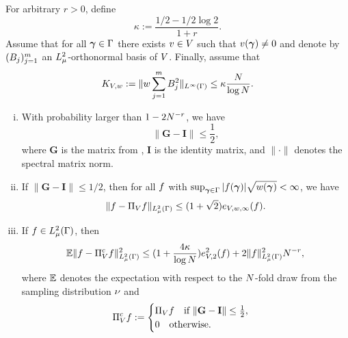 \begin{thm}
	\label{thm:dpls}
For arbitrary $r>0$, define 
$$\kappa:=\frac{1/2-1/2\log 2}{1+r}.$$ Assume that for all $\bm{\gamma}\in\Gamma$ there exists $v\in V$ such that $v(\bm{\gamma})\not =0$ and denote by $(B_j)_{j=1}^{m}$ an $L^2_{\mu}$-orthonormal basis of $V$. Finally, assume that 
\begin{equation}
\label{eq:K}
K_{V,w}:=\|w \sum_{j=1}^{m}B_j^2\|_{L^\infty(\Gamma)}\leq \kappa\frac{N}{\log N}.
\end{equation}
\begin{enumerate}[(i)]
	\item With probability larger than $1-2N^{-r}$, we have
	\begin{equation}
	\|\mathbf{G}-\mathbf{I}\|\leq\frac{1}{2},
	\end{equation}
	where $\mathbf{G}$ is the matrix from , $\mathbf{I}$ is the identity matrix, and $\|{\cdot}\|$ denotes the spectral matrix norm.
	\item If $\|{\mathbf{G}-\mathbf{I}}\|\leq 1/2$, then for all $f$ with $\sup_{\bm{\gamma}\in\Gamma}|f(\bm{\gamma})|\sqrt{w(\bm{\gamma})}<\infty$, we have
	\begin{equation*}
		\|f-\Pi_{V}f\|_{L^2_{\mu}(\Gamma)}\leq (1+\sqrt{2})e_{V,w,\infty}(f).
	\end{equation*}
\item If $f\in L^2_{\mu}(\Gamma)$, then 
\begin{equation*}
\mathbb{E}\|f-\Pi^{c}_{V}f\|_{L^2_{\mu}(\Gamma)}^2\leq (1+\frac{4\kappa}{\log N})e^2_{V,2}(f)+2\|f\|_{L^2_{\mu}(\Gamma)}^2N^{-r},
\end{equation*}
where $\mathbb{E}$ denotes the expectation with respect to the $N$-fold draw from the sampling distribution $\nu$ and 
\begin{equation*}
\Pi^{c}_{V}f:=\begin{cases}
\Pi_{V}f\quad\text{if }\|{\mathbf{G}-\mathbf{I}}\|\leq\frac{1}{2},\\
0\quad\text{otherwise}.
\end{cases}
\end{equation*}
\end{enumerate}
\end{thm}
